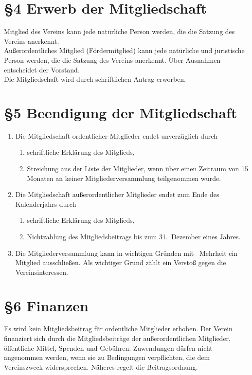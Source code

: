 \documentclass[ngerman]{article}
\begin{document}
\section*{§4 Erwerb der Mitgliedschaft}
Mitglied des Vereins kann jede natürliche Person werden, die die Satzung des Vereins anerkennt.\\

Außerordentliches Mitglied (\glqq Fördermitglied\grqq) kann jede natürliche und juristische Person werden, die die Satzung des Vereins anerkennt.
Über Ausnahmen entscheidet der Vorstand.\\
Die Mitgliedschaft wird durch schriftlichen Antrag erworben.


\section*{§5 Beendigung der Mitgliedschaft}
\begin{enumerate}
 \item Die Mitgliedschaft ordentlicher Mitglieder endet unverzüglich durch
  \begin{enumerate}
      \item schriftliche Erklärung des Mitglieds,
      \item Streichung aus der Liste der Mitglieder, wenn über einen Zeitraum von 15 Monaten an keiner Mitgliederversammlung teilgenommen wurde.
  \end{enumerate}
  \item Die Mitgliedschaft außerordentlicher Mitglieder endet zum Ende des Kalenderjahrs durch
  \begin{enumerate}
    \item schriftliche Erklärung des Mitglieds,
    \item Nichtzahlung des Mitgliedsbeitrags bis zum 31.\, Dezember eines Jahres.
  \end{enumerate}
 \item Die Mitgliederversammlung kann in wichtigen Gründen mit \ Mehrheit ein Mitglied ausschließen. Als wichtiger Grund zählt ein Verstoß gegen die Vereinsinteressen.
\end{enumerate}


\section*{§6 Finanzen}
Es wird kein Mitgliedsbeitrag für ordentliche Mitglieder erhoben. Der Verein finanziert sich durch die Mitgliedsbeiträge der außerordentlichen Mitglieder, öffentliche Mittel, Spenden und Gebühren. Zuwendungen dürfen nicht angenommen werden, wenn sie zu Bedingungen verpflichten, die dem Vereinszweck widersprechen.
Näheres regelt die Beitragsordnung.
\end{document}
